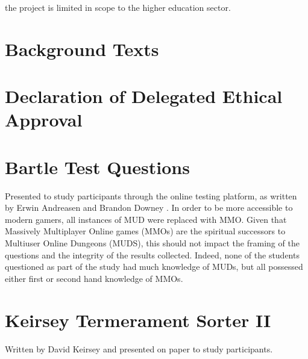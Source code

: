 \documentclass[12pt,a4paper,twoside]{report}
\begin{document}
 the project is limited in scope to the higher education sector. 

\chapter{Background Texts}
\begin{appendices}
	
\chapter{Declaration of Delegated Ethical Approval}
\label{sec:bsrec}

	
\chapter{Bartle Test Questions}
\label{sec:bartle}
Presented to study participants through the online testing platform, as written by Erwin Andreasen and Brandon Downey \cite{bartle-questions}. In order to be more accessible to modern gamers, all instances of MUD were replaced with MMO. Given that Massively Multiplayer Online games (MMOs) are the spiritual successors to Multiuser Online Dungeons (MUDS), this should not impact the framing of the questions and the integrity of the results collected. Indeed, none of the students questioned as part of the study had much knowledge of MUDs, but all possessed either first or second hand knowledge of MMOs.
\linespread{1.0}

\linespread{1.3}

\chapter{Keirsey Termerament Sorter II}
\label{sec:keirsey}
Written by David Keirsey \cite{keirsey1998please} and presented on paper to study participants.

\end{appendices}



\end{document}
